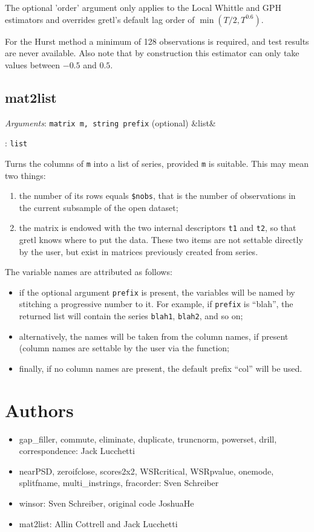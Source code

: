 \documentclass[11pt,english]{article}
\newcommand{\dollar}[1]{\texttt{\$#1}}
\newcommand{\ArgRet}[2]{%
  {\it Arguments}: {#1}%
  \ifx&#2&%
  \else
  \par\smallskip\noindent {\it Return type}: \texttt{#2}
  \fi%
  \par\medskip\par%
  }
\begin{document}
The optional 'order' argument only applies to the Local Whittle and GPH estimators and
overrides gretl's default lag order of $\min(T/2, T^{0.6})$.

For the Hurst method a minimum of 128 observations is required, and test results are
never available. Also note that by construction this estimator can only take values between
$-0.5$ and $0.5$.

\subsection{mat2list}

\ArgRet{\texttt{matrix m, string prefix} (optional)}{list}

Turns the columns of \texttt{m} into a list of series, provided
\texttt{m} is suitable. This may mean two things:
\begin{enumerate}
\item the number of its rows equals \dollar{nobs}, that is the number
  of observations in the current subsample of the open dataset;
\item the matrix is endowed with the two internal descriptors
  \texttt{t1} and \texttt{t2}, so that gretl knows where to put the
  data. These two items are not settable directly by the user, but
  exist in matrices previously created from series.
\end{enumerate}

The variable names are attributed as follows:
\begin{itemize}
\item if the optional argument
\texttt{prefix} is present, the variables will be named by stitching a
progressive number to it. For example, if \texttt{prefix} is ``blah'',
the returned list will contain the series \texttt{blah1},
\texttt{blah2}, and so on;
\item alternatively, the names will be taken from the column names, if
  present (column names are settable by the user via the
   function;
\item finally, if no column names are present, the default prefix
  ``col'' will be used.
\end{itemize}

\section{Authors}
\begin{itemize}
\item gap\_filler, commute, eliminate, duplicate, truncnorm, powerset,
  drill, correspondence: Jack Lucchetti

\item nearPSD, zeroifclose, scores2x2, WSRcritical, WSRpvalue, onemode,
splitfname, multi\_instrings, fracorder:
Sven Schreiber

\item winsor: Sven Schreiber, original code JoshuaHe

\item mat2list: Allin Cottrell and Jack Lucchetti

\end{itemize}
\end{document}

